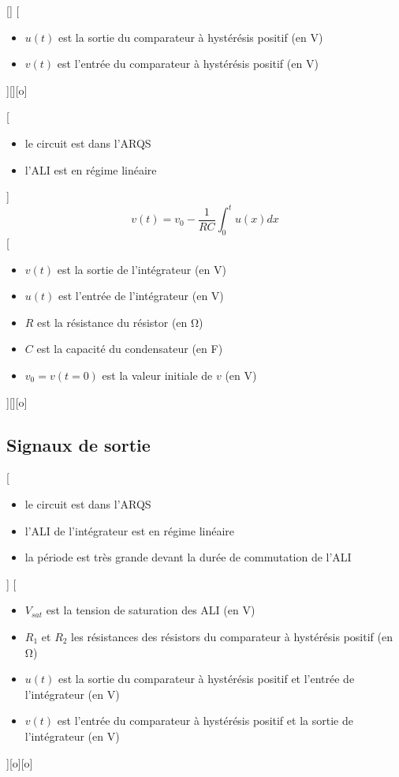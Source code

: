 
[]{\schema{}{5cm}}
[
  \begin{itemize}
    \item $u(t)$ est la sortie du comparateur à hystérésis positif (en \unit{V})
    \item $v(t)$ est l'entrée du comparateur à hystérésis positif (en \unit{V})
  \end{itemize}
][][o]

[
  \begin{itemize}
    \item le circuit est dans l'ARQS
    \item l'ALI est en régime linéaire
  \end{itemize}
]
{
  $$v(t)=v_0-\frac{1}{RC}\int_0^t u(x)dx$$
}
[
  \begin{itemize}
    \item $v(t)$ est la sortie de l'intégrateur (en \unit{V})
    \item $u(t)$ est l'entrée de l'intégrateur (en \unit{V})
    \item $R$ est la résistance du résistor (en \unit{\ohm})
    \item $C$ est la capacité du condensateur (en \unit{F})
    \item $v_0=v(t=0)$ est la valeur initiale de $v$ (en \unit{V})
  \end{itemize}
][][o]


\subsection{Signaux de sortie}

[
  \begin{itemize}
    \item le circuit est dans l'ARQS
    \item l'ALI de l'intégrateur est en régime linéaire
    \item la période est très grande devant la durée de commutation de l'ALI
  \end{itemize}
]
{\schema{}{4cm}}
[
  \begin{itemize}
    \item $V_{sat}$ est la tension de saturation des ALI (en \unit{V})
    \item $R_1$ et $R_2$ les résistances des résistors du comparateur à hystérésis positif (en \unit{\ohm})
    \item $u(t)$ est la sortie du comparateur à hystérésis positif et l'entrée de l'intégrateur (en \unit{V})
    \item $v(t)$ est l'entrée du comparateur à hystérésis positif et la sortie de l'intégrateur (en \unit{V})
  \end{itemize}
][o][o]

